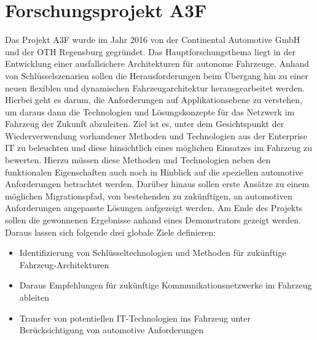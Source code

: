 \section{Forschungsprojekt A3F}
Das Projekt A3F wurde im Jahr 2016 von der Continental Automotive GmbH und der OTH Regensburg gegründet. Das Hauptforschungsthema liegt in der Entwicklung einer ausfallsichere Architekturen für autonome Fahrzeuge. Anhand von Schlüsselszenarien sollen die Herausforderungen beim Übergang hin zu einer neuen flexiblen und dynamischen Fahrzeugarchitektur herausgearbeitet werden. Hierbei geht es darum, die Anforderungen auf Applikationsebene zu verstehen, um daraus dann die Technologien und Lösungskonzepte für das Netzwerk im Fahrzeug der Zukunft abzuleiten. Ziel ist es, unter dem Gesichtspunkt der Wiederverwendung vorhandener Methoden und Technologien aus der Enterprise IT zu beleuchten und diese hinsichtlich eines möglichen Einsatzes im Fahrzeug zu bewerten. Hierzu müssen diese Methoden und Technologien neben den funktionalen Eigenschaften auch noch in Hinblick auf die speziellen automotive Anforderungen betrachtet werden. Darüber hinaus sollen erste Ansätze zu einem möglichen Migrationspfad, von bestehenden zu zukünftigen, an automotiven Anforderungen angepasste Lösungen aufgezeigt werden. Am Ende des Projekts sollen die gewonnenen Ergebnisse anhand eines Demonstrators gezeigt werden.
Daraus lassen sich folgende drei globale Ziele definieren:
\newpage
\begin{itemize}
	\item Identifizierung von Schlüsseltechnologien und Methoden für zukünftige Fahrzeug-Architekturen
	\item Daraus Empfehlungen für zukünftige Kommunikationsnetzwerke im Fahrzeug ableiten
	\item Transfer von potentiellen IT-Technologien ins Fahrzeug unter Berücksichtigung von automotive Anforderungen
\end{itemize}